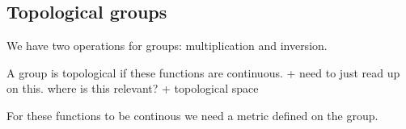 
\subsection{Topological groups}
We have two operations for groups: multiplication and inversion.

A group is topological if these functions are continuous.
+ need to just read up on this. where is this relevant?
+ topological space

For these functions to be continous we need a metric defined on the group.


